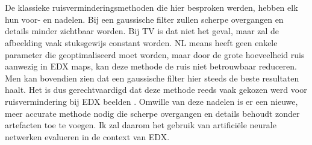 \documentclass{report}
\begin{document}
\\ \\
De klassieke ruisverminderingsmethoden die hier besproken werden, hebben elk hun voor- en nadelen. Bij een gaussische filter zullen scherpe overgangen en details minder zichtbaar worden. Bij TV is dat niet het geval, maar zal de afbeelding vaak stuksgewijs constant worden. NL means heeft geen enkele parameter die geoptimaliseerd moet worden, maar door de grote hoeveelheid ruis aanwezig in EDX maps, kan deze methode de ruis niet betrouwbaar reduceren. Men kan bovendien zien dat een gaussische filter hier steeds de beste resultaten haalt. Het is dus gerechtvaardigd dat deze methode reeds vaak gekozen werd voor ruisvermindering bij EDX beelden \cite{paper:edxprocessing}. Omwille van deze nadelen is er een nieuwe, meer accurate methode nodig die scherpe overgangen en details behoudt zonder artefacten toe te voegen. Ik zal daarom het gebruik van artificiële neurale netwerken evalueren in de context van EDX.
\end{document}

